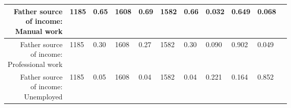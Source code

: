 \begin{longtable}{|r|l|l|l|l|l|l|l|l|l|l}
	 \makecell{Father source\\ of income: \\ Manual work}                               & 1185                                                               &  0.65                                                              & 1608                                                               &  0.69                                                              & 1582                                                               &  0.66                                                              & 0.032                                                              & 0.649                                                              & 0.068                                                             \\

\hline

	\makecell{ Father source\\ of income: \\ Professional work}                         & 1185                                                               &  0.30                                                              & 1608                                                               &  0.27                                                              & 1582                                                               &  0.30                                                              & 0.090                                                              & 0.902                                                              & 0.049                                                             \\

\hline

	 \makecell{Father source\\ of income: \\ Unemployed}                                & 1185                                                               &  0.05                                                              & 1608                                                               &  0.04                                                              & 1582                                                               &  0.04                                                              & 0.221                                                              & 0.164                                                              & 0.852                                                             \\


\end{longtable}
